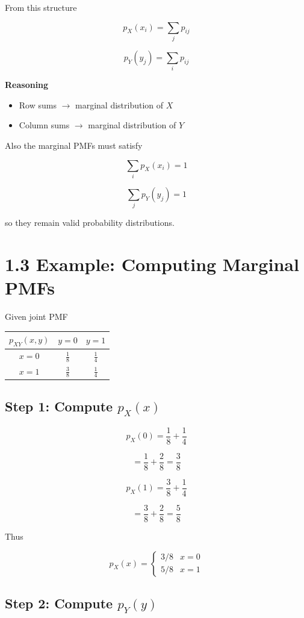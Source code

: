 \documentclass[12pt]{article}
\begin{document}
From this structure

\[
p_X(x_i) = \sum_j p_{ij}
\]

\[
p_Y(y_j) = \sum_i p_{ij}
\]

\textbf{Reasoning}

\begin{itemize}
\item Row sums $\rightarrow$ marginal distribution of $X$
\item Column sums $\rightarrow$ marginal distribution of $Y$
\end{itemize}

Also the marginal PMFs must satisfy

\[
\sum_i p_X(x_i)=1
\]

\[
\sum_j p_Y(y_j)=1
\]

so they remain valid probability distributions.

\section*{1.3 Example: Computing Marginal PMFs}

Given joint PMF

\begin{center}
\begin{tabular}{ccc}
\toprule
$p_{XY}(x,y)$ & $y=0$ & $y=1$ \\
\midrule
$x=0$ & $\frac{1}{8}$ & $\frac{1}{4}$ \\
$x=1$ & $\frac{3}{8}$ & $\frac{1}{4}$ \\
\bottomrule
\end{tabular}
\end{center}

\subsection*{Step 1: Compute $p_X(x)$}

\[
p_X(0)=\frac{1}{8}+\frac{1}{4}
\]

\[
=\frac{1}{8}+\frac{2}{8}=\frac{3}{8}
\]

\[
p_X(1)=\frac{3}{8}+\frac{1}{4}
\]

\[
=\frac{3}{8}+\frac{2}{8}=\frac{5}{8}
\]

Thus

\[
p_X(x)=
\begin{cases}
3/8 & x=0 \\
5/8 & x=1
\end{cases}
\]

\subsection*{Step 2: Compute $p_Y(y)$}
\end{document}
